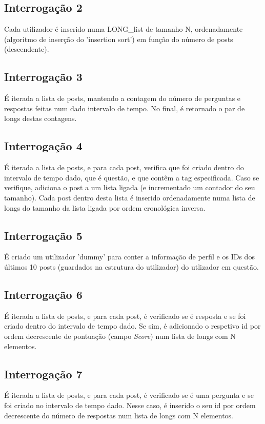 \documentclass[10pt]{report}
\newcommand\tab[1][0.5cm]{\hspace*{#1}}
\begin{document}
\subsection{Interrogação 2}
\tab Cada utilizador é inserido numa LONG\_list de tamanho N, ordenadamente (algoritmo de inserção do 'insertion sort') em função do número de posts (descendente).

\subsection{Interrogação 3}
\tab É iterada a lista de posts, mantendo a contagem do número de perguntas e respostas feitas num dado intervalo de tempo. No final, é retornado o par de longs destas contagens.

\subsection{Interrogação 4}
\tab É iterada a lista de posts, e para cada post, verifica que foi criado dentro do intervalo de tempo dado, que é questão, e que contêm a tag especificada. Caso se verifique, adiciona o post a um lista ligada (e incrementado um contador do seu tamanho). Cada post dentro desta lista é inserido ordenadamente numa lista de longs do tamanho da lista ligada por ordem cronológica inversa.

\subsection{Interrogação 5}
\tab É criado um utilizador 'dummy' para conter a informação de perfil e os IDs dos últimos 10 posts (guardados na estrutura do utilizador) do utlizador em questão.

\subsection{Interrogação 6}
\tab É iterada a lista de posts, e para cada post, é verificado se é resposta e se foi criado dentro do intervalo de tempo dado. Se sim, é adicionado o respetivo id por ordem decrescente de pontuação (campo \textit{Score}) num lista de longs com N elementos.

\subsection{Interrogação 7}
\tab É iterada a lista de posts, e para cada post, é verificado se é uma pergunta e se foi criado no intervalo de tempo dado. Nesse caso, é inserido o seu id por ordem decrescente do número de respostas num lista de longs com N elementos.
\end{document}
